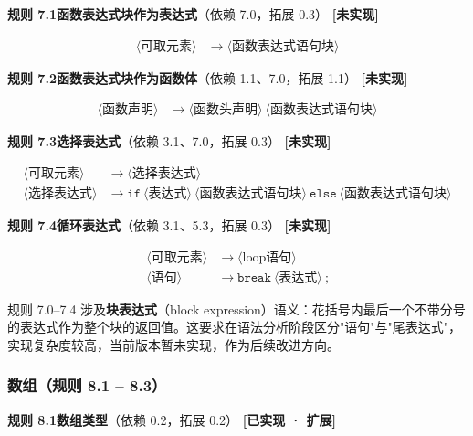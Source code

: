\documentclass[12pt,a4paper]{ctexart}
\begin{document}
\textbf{规则 7.1\quad 函数表达式块作为表达式}（依赖 7.0，拓展 0.3） \hfill \textcolor{red!70!black}{\textbf{[未实现]}}

\begin{align}
\langle\text{可取元素}\rangle &\rightarrow \langle\text{函数表达式语句块}\rangle
\end{align}

\textbf{规则 7.2\quad 函数表达式块作为函数体}（依赖 1.1、7.0，拓展 1.1） \hfill \textcolor{red!70!black}{\textbf{[未实现]}}

\begin{align}
\langle\text{函数声明}\rangle &\rightarrow \langle\text{函数头声明}\rangle \ \langle\text{函数表达式语句块}\rangle
\end{align}

\textbf{规则 7.3\quad 选择表达式}（依赖 3.1、7.0，拓展 0.3） \hfill \textcolor{red!70!black}{\textbf{[未实现]}}

\begin{align}
\langle\text{可取元素}\rangle &\rightarrow \langle\text{选择表达式}\rangle \\
\langle\text{选择表达式}\rangle &\rightarrow \texttt{if} \ \langle\text{表达式}\rangle \ \langle\text{函数表达式语句块}\rangle \ \texttt{else} \ \langle\text{函数表达式语句块}\rangle
\end{align}

\textbf{规则 7.4\quad 循环表达式}（依赖 3.1、5.3，拓展 0.3） \hfill \textcolor{red!70!black}{\textbf{[未实现]}}

\begin{align}
\langle\text{可取元素}\rangle &\rightarrow \langle\text{loop语句}\rangle \\
\langle\text{语句}\rangle &\rightarrow \texttt{break} \ \langle\text{表达式}\rangle \ \texttt{;}
\end{align}

规则 7.0--7.4 涉及\textbf{块表达式}（block expression）语义：花括号内最后一个不带分号的表达式作为整个块的返回值。这要求在语法分析阶段区分"语句"与"尾表达式"，实现复杂度较高，当前版本暂未实现，作为后续改进方向。

\subsubsection{数组（规则 8.1 -- 8.3）}

\textbf{规则 8.1\quad 数组类型}（依赖 0.2，拓展 0.2） \hfill \textcolor{green!60!black}{\textbf{[已实现 · 扩展]}}
\end{document}
